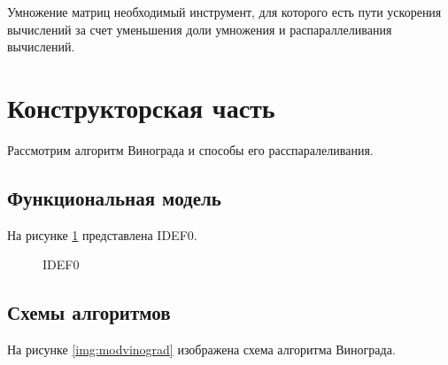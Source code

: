 \documentclass[a4paper,12pt]{article}
\begin{document}
Умножение матриц необходимый инструмент, для которого есть пути ускорения вычислений
за счет уменьшения доли умножения и распараллеливания вычислений.

\newpage
\section{Конструкторская часть}

Рассмотрим алгоритм Винограда и способы его расспаралеливания.

\subsection{Функциональная модель}

На рисунке \ref{img:idef0} представлена IDEF0.

\begin{figure}[H]
    \caption{IDEF0}
    \label{img:idef0}
\end{figure}

\subsection{Схемы алгоритмов}

На рисунке \ref{img:modvinograd} изображена схема
алгоритма Винограда.
\end{document}
